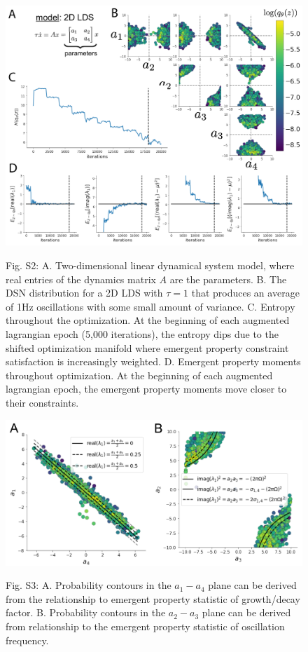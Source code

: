 \documentclass[11pt]{article}
\begin{document}
\begin{figure}
\begin{center}
\includegraphics[scale=0.5]{figures/figS2/figS2.pdf}
\end{center}
Fig. S2: A. Two-dimensional linear dynamical system model, where real entries of the dynamics matrix $A$ are the parameters.  B. The DSN distribution for a 2D LDS with $\tau=1$ that produces an average of 1Hz oscillations with some small amount of variance.  C. Entropy throughout the optimization.  At the beginning of each augmented lagrangian epoch (5,000 iterations), the entropy dips due to the shifted optimization manifold where emergent property constraint satisfaction is increasingly weighted.  D. Emergent property moments throughout optimization.  At the beginning of each augmented lagrangian epoch, the emergent property moments move closer to their constraints.
\end{figure}

\begin{figure}
\begin{center}
\includegraphics[scale=0.5]{figures/figS3/figS3.pdf}
\end{center}
Fig. S3: A. Probability contours in the $a_1-a_4$ plane can be derived from the relationship to emergent property statistic of growth/decay factor. B. Probability contours in the $a_2-a_3$ plane can be derived from relationship to the emergent property statistic of oscillation frequency.
\end{figure}
\end{document}
